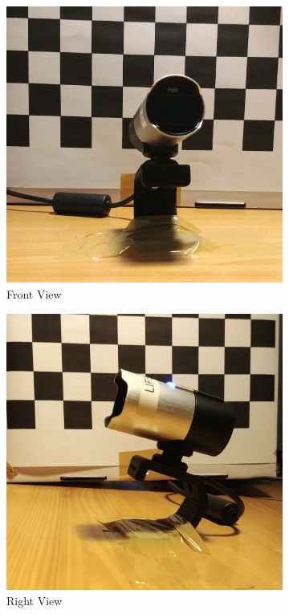 \documentclass[10pt,a4paper]{article}
\begin{document}
				\begin{figure}[H]
					\begin{subfigure}{0.5\textwidth}
						\centering
						\includegraphics[width=0.8\linewidth]{images/front_cam.jpg}
						\caption{Front View}
						\label{fig:fview}
					\end{subfigure}%
					\begin{subfigure}{0.5\textwidth}
						\centering
						\includegraphics[width=0.8\linewidth]{images/right_cam.jpg}
						\caption{Right View}
						\label{fig:rview}
					\end{subfigure}
					\begin{subfigure}{0.5\textwidth}

\end{subfigure}
\end{figure}
\end{document}
